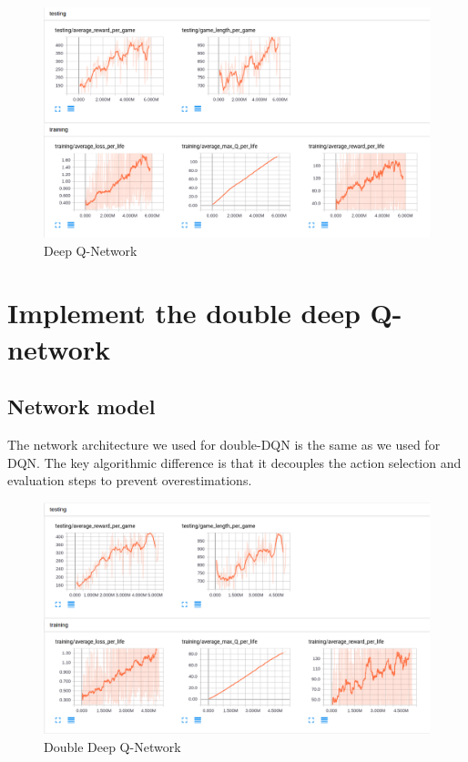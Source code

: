 \documentclass{article}
\begin{document}
\begin{figure}[h]
\centering
\includegraphics[scale=0.3]{dqn.png}
\caption{Deep Q-Network}
\end{figure}

\section*{Implement the double deep Q-network}
\subsection*{Network model}
The network architecture we used for double-DQN is the same as we used for DQN. The key algorithmic difference is that it decouples the action selection and evaluation steps to prevent overestimations.

\begin{figure}[h]
\centering
\includegraphics[scale=0.3]{double.png}
\caption{Double Deep Q-Network}
\end{figure}
\end{document}
